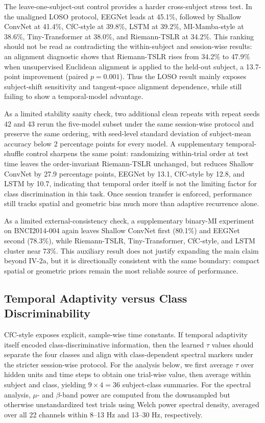 \documentclass[journal]{IEEEtran}
\begin{document}
The leave-one-subject-out control provides a harder cross-subject stress test. In the unaligned LOSO protocol, EEGNet leads at 45.1\%, followed by Shallow ConvNet at 41.4\%, CfC-style at 39.8\%, LSTM at 39.2\%, MI-Mamba-style at 38.6\%, Tiny-Transformer at 38.0\%, and Riemann-TSLR at 34.2\%. This ranking should not be read as contradicting the within-subject and session-wise results: an alignment diagnostic shows that Riemann-TSLR rises from 34.2\% to 47.9\% when unsupervised Euclidean alignment is applied to the held-out subject, a 13.7-point improvement (paired $p = 0.001$). Thus the LOSO result mainly exposes subject-shift sensitivity and tangent-space alignment dependence, while still failing to show a temporal-model advantage.

As a limited stability sanity check, two additional clean repeats with repeat seeds 42 and 43 rerun the five-model subset under the same session-wise protocol and preserve the same ordering, with seed-level standard deviation of subject-mean accuracy below 2 percentage points for every model. A supplementary temporal-shuffle control sharpens the same point: randomizing within-trial order at test time leaves the order-invariant Riemann-TSLR unchanged, but reduces Shallow ConvNet by 27.9 percentage points, EEGNet by 13.1, CfC-style by 12.8, and LSTM by 10.7, indicating that temporal order itself is not the limiting factor for class discrimination in this task. Once session transfer is enforced, performance still tracks spatial and geometric bias much more than adaptive recurrence alone.

As a limited external-consistency check, a supplementary binary-MI experiment on BNCI2014-004 again leaves Shallow ConvNet first (80.1\%) and EEGNet second (78.3\%), while Riemann-TSLR, Tiny-Transformer, CfC-style, and LSTM cluster near 73\%. This auxiliary result does not justify expanding the main claim beyond IV-2a, but it is directionally consistent with the same boundary: compact spatial or geometric priors remain the most reliable source of performance.

\subsection{Temporal Adaptivity versus Class Discriminability}
CfC-style exposes explicit, sample-wise time constants. If temporal adaptivity itself encoded class-discriminative information, then the learned $\tau$ values should separate the four classes and align with class-dependent spectral markers under the stricter session-wise protocol. For the analysis below, we first average $\tau$ over hidden units and time steps to obtain one trial-wise value, then average within subject and class, yielding $9 \times 4 = 36$ subject-class summaries. For the spectral analysis, $\mu$- and $\beta$-band power are computed from the downsampled but otherwise unstandardized test trials using Welch power spectral density, averaged over all 22 channels within 8--13 Hz and 13--30 Hz, respectively.
\end{document}
